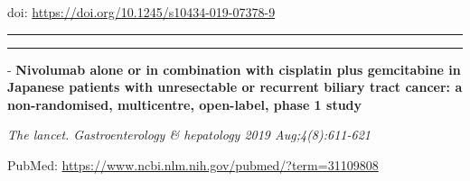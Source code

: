 \documentclass[]{article}
\begin{document}
doi: \url{https://doi.org/10.1245/s10434-019-07378-9}

{}

{}

\begin{center}\rule{0.5\linewidth}{\linethickness}\end{center}

\begin{center}\rule{0.5\linewidth}{\linethickness}\end{center}

 - \textbf{Nivolumab alone or in combination with cisplatin plus
gemcitabine in Japanese patients with unresectable or recurrent biliary
tract cancer: a non-randomised, multicentre, open-label, phase 1 study}

\emph{The lancet. Gastroenterology \& hepatology 2019 Aug;4(8):611-621}

PubMed: \url{https://www.ncbi.nlm.nih.gov/pubmed/?term=31109808}
\end{document}
